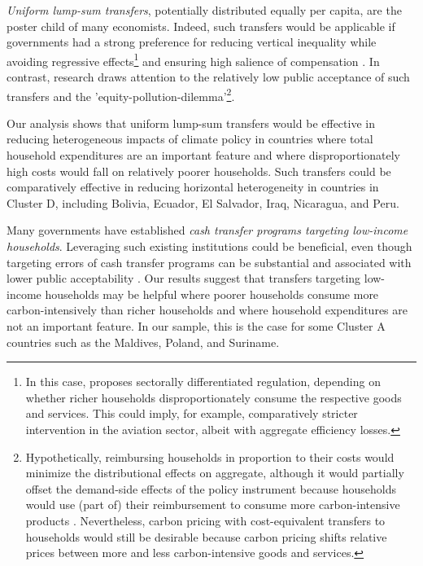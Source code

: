 \documentclass[12pt, a4paper]{article}
\begin{document}
\textit{Uniform lump-sum transfers}, potentially distributed equally per capita, are the poster child of many economists. Indeed, such transfers would be applicable if governments had a strong preference for reducing vertical inequality while avoiding regressive effects\footnote{In this case, \textcite{Stiglitz.2019} proposes sectorally differentiated regulation, depending on whether richer households disproportionately consume the respective goods and services. This could imply, for example, comparatively stricter intervention in the aviation sector, albeit with aggregate efficiency losses.} and ensuring high salience of compensation \autocite{Chetty.2009}. In contrast, research draws attention to the relatively low public acceptance of such transfers and the 'equity-pollution-dilemma'\footnote{Hypothetically, reimbursing households in proportion to their costs would minimize the distributional effects on aggregate, although it would partially offset the demand-side effects of the policy instrument because households would use (part of) their reimbursement to consume more carbon-intensive products \autocite[see also][]{Stiglitz.2019}. Nevertheless, carbon pricing with cost-equivalent transfers to households would still be desirable because carbon pricing shifts relative prices between more and less carbon-intensive goods and services.}\autocite{Sager.2019}.

Our analysis shows that uniform lump-sum transfers would be effective in reducing heterogeneous impacts of climate policy in countries where total household expenditures are an important feature and where disproportionately high costs would fall on relatively poorer households. Such transfers could be comparatively effective in reducing horizontal heterogeneity in countries in Cluster D, including Bolivia, Ecuador, El Salvador, Iraq, Nicaragua, and Peru. %

Many governments have established \textit{cash transfer programs targeting low-income households}. Leveraging such existing institutions could be beneficial, even though targeting errors of cash transfer programs can be substantial \autocite{Banerjee.2022} and associated with lower public acceptability \autocite{Bah.2019}. Our results suggest that transfers targeting low-income households may be helpful where poorer households consume more carbon-intensively than richer households and where household expenditures are not an important feature. In our sample, this is the case for some Cluster A countries such as the Maldives, Poland, and Suriname.
\end{document}

